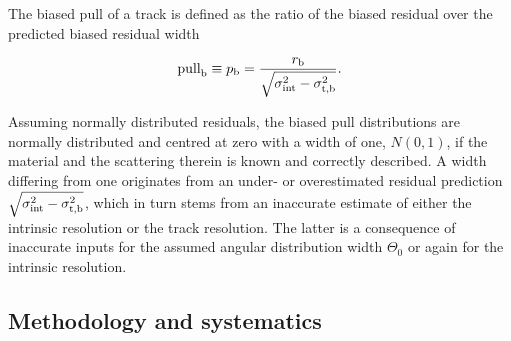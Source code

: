 The biased pull of a track is defined as the ratio of the biased residual over the predicted biased residual width

\begin{equation}
 \textrm{pull}_{\textrm{b}} \equiv p_{\textrm{b}} = \frac{r_{\textrm{b}}}{\sqrt{\sigma_{\textrm{int}}^2 - \sigma_{\textrm{t,b}}^2}}.
 \label{eq:pull}
\end{equation}

\noindent
Assuming normally distributed residuals, the biased pull distributions are normally distributed and centred at zero with a width of one, $N(0,1)$,
 if the material and the scattering therein is known and correctly described. 
A width differing from one originates from an under- or overestimated residual prediction $\sqrt{\sigma_{\textrm{int}}^2 - \sigma_{\textrm{t,b}}^2}$, which in turn stems from an inaccurate estimate of either the intrinsic resolution
 or the track resolution. 
The latter is a consequence of inaccurate inputs for the assumed angular distribution width $\Theta_0$ or again for the intrinsic resolution. 


\subsection{Methodology and systematics}
\label{sec:meth}

